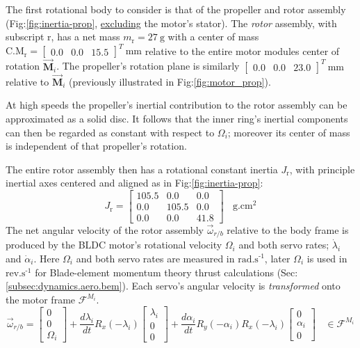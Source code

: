 \par
The first rotational body to consider is that of the propeller and rotor assembly (Fig:\ref{fig:inertia-prop}, \underline{excluding} the motor's stator). The \emph{rotor} assembly, with subscript r, has a net mass $m_{\text{r}}=27~\text{g}$ with a center of mass $\text{C.M}_{\text{r}}=\begin{bmatrix}0.0&0.0&15.5\end{bmatrix}^T~\text{mm}$ relative to the entire motor modules center of rotation $\vec{\mathbf{M}}_i$. The propeller's rotation plane is similarly $\begin{bmatrix}0.0&0.0&23.0\end{bmatrix}^T~\text{mm}$ relative to $\vec{\mathbf{M}}_i$ (previously illustrated in Fig:\ref{fig:motor_prop}). 
\par
At high speeds the propeller's inertial contribution to the rotor assembly can be approximated as a solid disc. It follows that the inner ring's inertial components can then be regarded as constant with respect to $\Omega_i$; moreover its center of mass is independent of that propeller's rotation. 
\par
The entire rotor assembly then has a rotational constant inertia $J_\text{r}$, with principle inertial axes centered and aligned as in Fig:\ref{fig:inertia-prop}:
\begin{equation}\label{eq:prop-inertia}
J_\text{r}=\begin{bmatrix}
105.5 & 0.0 & 0.0\\
0.0 & 105.5 & 0.0\\
0.0 & 0.0 & 41.8
\end{bmatrix}~~~~\text{g.cm}^2
\end{equation}
The net angular velocity of the rotor assembly $\vec{\omega}_{r/b}$ relative to the body frame is produced by the BLDC motor's rotational velocity $\Omega_i$ and both servo rates; $\dot{\lambda}_i$ and $\dot{\alpha}_i$. Here $\Omega_i$ and both servo rates are measured in $\text{rad.s}^{\text{-}1}$, later $\Omega_i$ is used in $\text{rev.s}^{\text{-}1}$ for Blade-element momentum theory thrust calculations (Sec:\ref{subsec:dynamics.aero.bem}). Each servo's angular velocity is \emph{transformed} onto the motor frame $\mathcal{F}^{M_i}$.
\begin{equation}\label{eq:net-angular-rot}
\vec{\omega}_{r/b}=\begin{bmatrix}
0\\
0\\
\Omega_i
\end{bmatrix}
+\frac{d\lambda_i}{dt}R_x(-\lambda_i)\begin{bmatrix}
\lambda_i\\
0\\
0
\end{bmatrix}+\frac{d\alpha_i}{dt}R_y(-\alpha_i)R_x(-\lambda_i)\begin{bmatrix}
0\\
\alpha_i\\
0
\end{bmatrix}~~~~\in\mathcal{F}^{M_i}
\end{equation}
